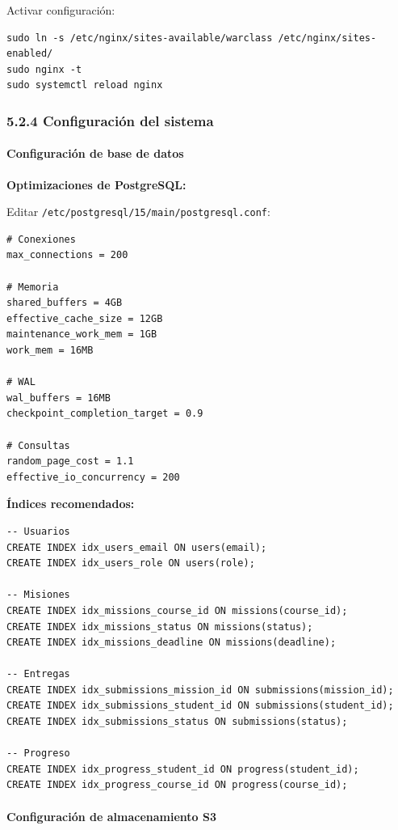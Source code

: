 Activar configuración:

\begin{verbatim}
sudo ln -s /etc/nginx/sites-available/warclass /etc/nginx/sites-enabled/
sudo nginx -t
sudo systemctl reload nginx
\end{verbatim}

\subsubsection{5.2.4 Configuración del sistema}

\paragraph{Configuración de base de datos}

\textbf{Optimizaciones de PostgreSQL:}

Editar \texttt{/etc/postgresql/15/main/postgresql.conf}:

\begin{verbatim}
# Conexiones
max_connections = 200

# Memoria
shared_buffers = 4GB
effective_cache_size = 12GB
maintenance_work_mem = 1GB
work_mem = 16MB

# WAL
wal_buffers = 16MB
checkpoint_completion_target = 0.9

# Consultas
random_page_cost = 1.1
effective_io_concurrency = 200
\end{verbatim}

\textbf{Índices recomendados:}

\begin{verbatim}
-- Usuarios
CREATE INDEX idx_users_email ON users(email);
CREATE INDEX idx_users_role ON users(role);

-- Misiones
CREATE INDEX idx_missions_course_id ON missions(course_id);
CREATE INDEX idx_missions_status ON missions(status);
CREATE INDEX idx_missions_deadline ON missions(deadline);

-- Entregas
CREATE INDEX idx_submissions_mission_id ON submissions(mission_id);
CREATE INDEX idx_submissions_student_id ON submissions(student_id);
CREATE INDEX idx_submissions_status ON submissions(status);

-- Progreso
CREATE INDEX idx_progress_student_id ON progress(student_id);
CREATE INDEX idx_progress_course_id ON progress(course_id);
\end{verbatim}

\paragraph{Configuración de almacenamiento S3}


